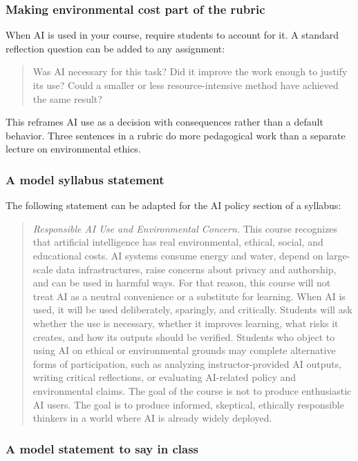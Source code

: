 \documentclass[12pt]{article}
\begin{document}
\subsubsection*{Making environmental cost part of the rubric}

When AI is used in your course, require students to account for it. A standard reflection question can be added to any assignment:

\begin{quote}
Was AI necessary for this task? Did it improve the work enough to justify its use? Could a smaller or less resource-intensive method have achieved the same result?
\end{quote}

This reframes AI use as a decision with consequences rather than a default behavior. Three sentences in a rubric do more pedagogical work than a separate lecture on environmental ethics.

\subsubsection*{A model syllabus statement}

The following statement can be adapted for the AI policy section of a syllabus:

\begin{quote}
\emph{Responsible AI Use and Environmental Concern.} This course recognizes that artificial intelligence has real environmental, ethical, social, and educational costs. AI systems consume energy and water, depend on large-scale data infrastructures, raise concerns about privacy and authorship, and can be used in harmful ways. For that reason, this course will not treat AI as a neutral convenience or a substitute for learning. When AI is used, it will be used deliberately, sparingly, and critically. Students will ask whether the use is necessary, whether it improves learning, what risks it creates, and how its outputs should be verified. Students who object to using AI on ethical or environmental grounds may complete alternative forms of participation, such as analyzing instructor-provided AI outputs, writing critical reflections, or evaluating AI-related policy and environmental claims. The goal of the course is not to produce enthusiastic AI users. The goal is to produce informed, skeptical, ethically responsible thinkers in a world where AI is already widely deployed.
\end{quote}

\subsubsection*{A model statement to say in class}
\end{document}
